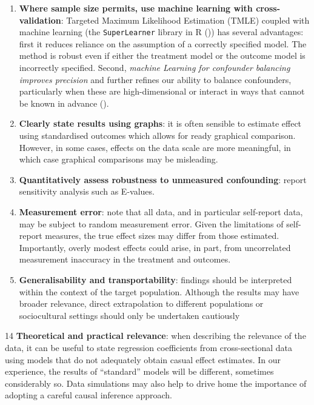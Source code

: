\documentclass[
  singlecolumn]{article}
\begin{document}
\begin{enumerate}
\def\labelenumi{\arabic{enumi}.}
\setcounter{enumi}{8}
\item
  \textbf{Where sample size permits, use machine learning with
  cross-validation}: Targeted Maximum Likelihood Estimation (TMLE)
  coupled with machine learning (the \texttt{SuperLearner} library in R
  ()) has several
  advantages: first it reduces reliance on the assumption of a correctly
  specified model. The method is robust even if either the treatment
  model or the outcome model is incorrectly specified. Second,
  \emph{machine Learning for confounder balancing improves precision}
  and further refines our ability to balance confounders, particularly
  when these are high-dimensional or interact in ways that cannot be
  known in advance ().
\item
  \textbf{Clearly state results using graphs}: it is often sensible to
  estimate effect using standardised outcomes which allows for ready
  graphical comparison. However, in some cases, effects on the data
  scale are more meaningful, in which case graphical comparisons may be
  misleading.
\item
  \textbf{Quantitatively assess robustness to unmeasured confounding}:
  report sensitivity analysis such as E-values.
\item
  \textbf{Measurement error}: note that all data, and in particular
  self-report data, may be subject to random measurement error. Given
  the limitations of self-report measures, the true effect sizes may
  differ from those estimated. Importantly, overly modest effects could
  arise, in part, from uncorrelated measurement inaccuracy in the
  treatment and outcomes.
\item
  \textbf{Generalisability and transportability}: findings should be
  interpreted within the context of the target population. Although the
  results may have broader relevance, direct extrapolation to different
  populations or sociocultural settings should only be undertaken
  cautiously
\end{enumerate}

14 \textbf{Theoretical and practical relevance}: when describing the
relevance of the data, it can be useful to state regression coefficients
from cross-sectional data using models that do not adequately obtain
casual effect estimates. In our experience, the results of ``standard''
models will be different, sometimes considerably so. Data simulations
may also help to drive home the importance of adopting a careful causal
inference approach.
\end{document}
